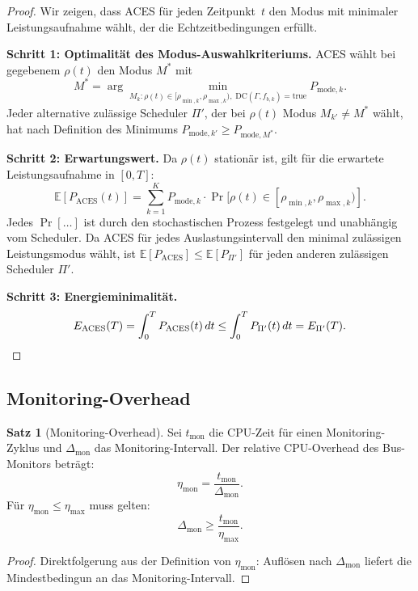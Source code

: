 ﻿\documentclass[a4paper,12pt]{article}
\theoremstyle{definition}
\newtheorem{satz}{Satz}
\begin{document}
\begin{proof}
Wir zeigen, dass ACES f\"{u}r jeden Zeitpunkt~$t$ den Modus mit minimaler Leistungsaufnahme
w\"{a}hlt, der die Echtzeitbedingungen erf\"{u}llt.

\textbf{Schritt 1: Optimalit\"{a}t des Modus-Auswahlkriteriums.}
ACES w\"{a}hlt bei gegebenem $\rho(t)$ den Modus $M^*$ mit
\[
    M^* = \arg\min_{M_k: \rho(t) \in [\rho_{\min,k}, \rho_{\max,k}),\; \text{DC}(\Gamma, f_{b,k}) = \text{true}}
    P_{\mathrm{mode},k}.
\]
Jeder alternative zul\"{a}ssige Scheduler $\Pi'$, der bei $\rho(t)$ Modus $M_{k'} \neq M^*$ w\"{a}hlt,
hat nach Definition des Minimums $P_{\mathrm{mode},k'} \geq P_{\mathrm{mode},M^*}$.

\textbf{Schritt 2: Erwartungswert.}
Da $\rho(t)$ station\"{a}r ist, gilt f\"{u}r die erwartete Leistungsaufnahme in $[0, T]$:
\[
    \mathbb{E}[P_{\mathrm{ACES}}(t)] = \sum_{k=1}^{K} P_{\mathrm{mode},k} \cdot \Pr[\rho(t) \in [\rho_{\min,k}, \rho_{\max,k})].
\]
Jedes $\Pr[\ldots]$ ist durch den stochastischen Prozess festgelegt und unabh\"{a}ngig
vom Scheduler. Da ACES f\"{u}r jedes Auslastungsintervall den minimal zul\"{a}ssigen
Leistungsmodus w\"{a}hlt, ist $\mathbb{E}[P_{\mathrm{ACES}}] \leq \mathbb{E}[P_{\Pi'}]$
f\"{u}r jeden anderen zul\"{a}ssigen Scheduler $\Pi'$.

\textbf{Schritt 3: Energieminimalit\"{a}t.}
\[
    E_{\mathrm{ACES}}(T) = \int_0^T P_{\mathrm{ACES}}(t)\, dt
    \leq \int_0^T P_{\Pi'}(t)\, dt = E_{\Pi'}(T). \qedhere
\]
\end{proof}

\subsection{Monitoring-Overhead}

\begin{satz}[Monitoring-Overhead]
\label{satz:overhead}
Sei $t_{\mathrm{mon}}$ die CPU-Zeit f\"{u}r einen Monitoring-Zyklus
und $\Delta_{\mathrm{mon}}$ das Monitoring-Intervall.
Der relative CPU-Overhead des Bus-Monitors betr\"{a}gt:
\[
    \eta_{\mathrm{mon}} = \frac{t_{\mathrm{mon}}}{\Delta_{\mathrm{mon}}}.
\]
F\"{u}r $\eta_{\mathrm{mon}} \leq \eta_{\max}$ muss gelten:
\[
    \Delta_{\mathrm{mon}} \geq \frac{t_{\mathrm{mon}}}{\eta_{\max}}.
\]
\end{satz}

\begin{proof}
Direktfolgerung aus der Definition von $\eta_{\mathrm{mon}}$: Aufl\"{o}sen nach $\Delta_{\mathrm{mon}}$
liefert die Mindestbedingun an das Monitoring-Intervall.
\end{proof}
\end{document}
